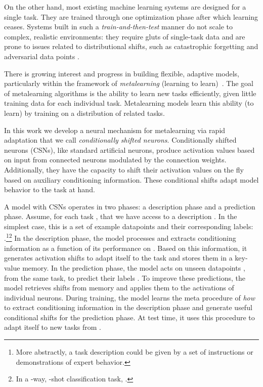 \documentclass{article}
\begin{document}
On the other hand, most existing machine learning systems are designed for a single task. They are trained through one optimization phase after which learning ceases. Systems built in such a \textit{train-and-then-test} manner do not scale to complex, realistic environments: they require gluts of single-task data and are prone to issues related to distributional shifts, such as catastrophic forgetting \cite{srivastava2013compete,goodfellow2013empirical,kirkpatrick2016overcoming} and adversarial data points \cite{szegedy2013intriguing}.

There is growing interest and progress in building flexible, adaptive models, particularly within the framework of \emph{metalearning} (learning to learn)~\citep{mitchell1993explanation,andrychowicz2016learning,vinyals2016matching,pmlr-v70-bachman17a}.
The goal of metalearning algorithms is the ability to learn new tasks efficiently, given little training data for each individual task.
Metalearning models learn this ability (to learn) by training on a distribution of related tasks.

In this work we develop a neural mechanism for metalearning via rapid adaptation that we call \emph{conditionally shifted neurons}.
Conditionally shifted neurons (CSNs), like standard artificial neurons, produce activation values based on input from connected neurons modulated by the connection weights. Additionally, they have the capacity to shift their activation values on the fly based on auxiliary conditioning information.
These conditional shifts adapt model behavior to the task at hand.

A model with CSNs operates in two phases: a description phase and a prediction phase.
Assume, for each task , that we have access to a description . In the simplest case, this is a set of example datapoints and their corresponding labels: .\footnote{More abstractly, a task description could be given by a set of instructions or demonstrations of expert behavior.}\footnote{In a -way, -shot classification task, .}
In the description phase, the model processes  and extracts conditioning information as a function of its performance on .
Based on this information, it generates activation shifts to adapt itself to the task and stores them in a key-value memory.
In the prediction phase, the model acts on unseen datapoints , from the same task, to predict their labels .
To improve these predictions, the model retrieves shifts from memory and applies them to the activations of individual neurons.
During training, the model learns the meta procedure of \emph{how} to extract conditioning information in the description phase and generate useful conditional shifts for the prediction phase.
At test time, it uses this procedure to adapt itself to new tasks from .
\end{document}
